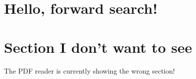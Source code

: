

\huge


\section{Hello, forward search!}

\vspace{1ex}
\lipsum[1-2]
\newpage

\section{Section I don't want to see}
{\sc The PDF reader is currently showing the wrong section!}

\vspace{1ex}
\lipsum[3]










